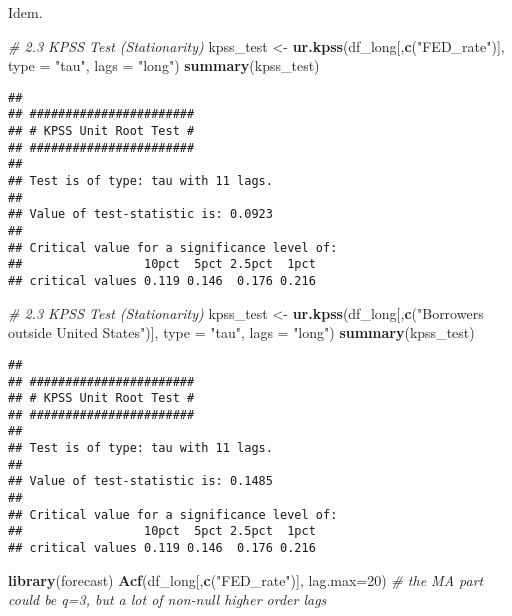 \documentclass[
]{article}
\newenvironment{Shaded}{\begin{snugshade}}{\end{snugshade}}
\newcommand{\AttributeTok}[1]{\textcolor[rgb]{0.13,0.29,0.53}{#1}}
\newcommand{\CommentTok}[1]{\textcolor[rgb]{0.56,0.35,0.01}{\textit{#1}}}
\newcommand{\DecValTok}[1]{\textcolor[rgb]{0.00,0.00,0.81}{#1}}
\newcommand{\FunctionTok}[1]{\textcolor[rgb]{0.13,0.29,0.53}{\textbf{#1}}}
\newcommand{\NormalTok}[1]{#1}
\newcommand{\OtherTok}[1]{\textcolor[rgb]{0.56,0.35,0.01}{#1}}
\newcommand{\StringTok}[1]{\textcolor[rgb]{0.31,0.60,0.02}{#1}}
\begin{document}
Idem.

\begin{Shaded}
\begin{Highlighting}[]
\CommentTok{\# 2.3 KPSS Test (Stationarity)}
\NormalTok{kpss\_test }\OtherTok{\textless{}{-}} \FunctionTok{ur.kpss}\NormalTok{(df\_long[,}\FunctionTok{c}\NormalTok{(}\StringTok{"FED\_rate"}\NormalTok{)], }\AttributeTok{type =} \StringTok{"tau"}\NormalTok{, }\AttributeTok{lags =} \StringTok{"long"}\NormalTok{)}
\FunctionTok{summary}\NormalTok{(kpss\_test)}
\end{Highlighting}
\end{Shaded}

\begin{verbatim}
## 
## ####################### 
## # KPSS Unit Root Test # 
## ####################### 
## 
## Test is of type: tau with 11 lags. 
## 
## Value of test-statistic is: 0.0923 
## 
## Critical value for a significance level of: 
##                 10pct  5pct 2.5pct  1pct
## critical values 0.119 0.146  0.176 0.216
\end{verbatim}

\begin{Shaded}
\begin{Highlighting}[]
\CommentTok{\# 2.3 KPSS Test (Stationarity)}
\NormalTok{kpss\_test }\OtherTok{\textless{}{-}} \FunctionTok{ur.kpss}\NormalTok{(df\_long[,}\FunctionTok{c}\NormalTok{(}\StringTok{"Borrowers outside United States"}\NormalTok{)], }\AttributeTok{type =} \StringTok{"tau"}\NormalTok{, }\AttributeTok{lags =} \StringTok{"long"}\NormalTok{)}
\FunctionTok{summary}\NormalTok{(kpss\_test)}
\end{Highlighting}
\end{Shaded}

\begin{verbatim}
## 
## ####################### 
## # KPSS Unit Root Test # 
## ####################### 
## 
## Test is of type: tau with 11 lags. 
## 
## Value of test-statistic is: 0.1485 
## 
## Critical value for a significance level of: 
##                 10pct  5pct 2.5pct  1pct
## critical values 0.119 0.146  0.176 0.216
\end{verbatim}

\begin{Shaded}
\begin{Highlighting}[]
\FunctionTok{library}\NormalTok{(forecast)}
\FunctionTok{Acf}\NormalTok{(df\_long[,}\FunctionTok{c}\NormalTok{(}\StringTok{"FED\_rate"}\NormalTok{)], }\AttributeTok{lag.max=}\DecValTok{20}\NormalTok{) }\CommentTok{\# the MA part could be q=3, but a lot of non{-}null higher order lags}
\end{Highlighting}
\end{Shaded}
\end{document}

